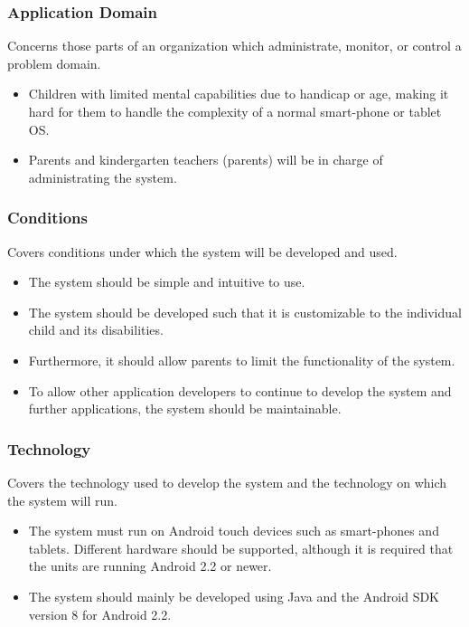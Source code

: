 \subsubsection{Application Domain} 
Concerns those parts of an organization which administrate, monitor, or control a
problem domain.
\begin{itemize}
	\item Children with limited mental capabilities due to handicap or age, making it hard for them to handle the complexity of a normal smart-phone or tablet OS. 
	\item Parents and kindergarten teachers (parents) will be in charge of administrating the system.
\end{itemize}

\subsubsection{Conditions} 
Covers conditions under which the system will be developed and used.
\begin{itemize}
	\item The system should be simple and intuitive to use. 
	\item The system should be developed such that it is customizable to the individual child and its disabilities.
	\item Furthermore, it should allow parents to limit the functionality of the system. 
	\item To allow other application developers to continue to develop the system and further applications, the system should be maintainable.
\end{itemize}

\subsubsection{Technology} 
Covers the technology used to develop the system and the technology on which the system will
run.
\begin{itemize}
	\item The system must run on Android touch devices such as smart-phones and tablets. Different hardware should be supported, although it is required that the units are running Android 2.2 or newer. 
	\item The system should mainly be developed using Java and the Android SDK version 8 for Android 2.2.
\end{itemize}

